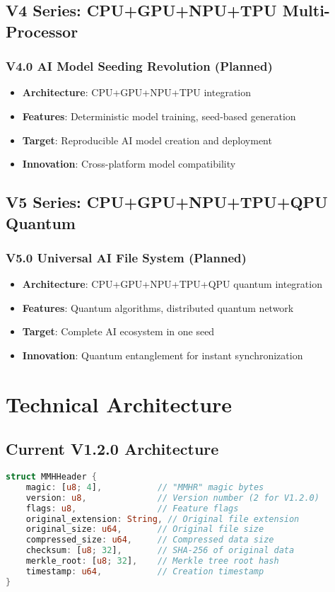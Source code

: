\documentclass[12pt,a4paper]{article}
\begin{document}
\subsection{V4 Series: CPU+GPU+NPU+TPU Multi-Processor}
\subsubsection{V4.0 AI Model Seeding Revolution (Planned)}
\begin{itemize}
    \item \textbf{Architecture}: CPU+GPU+NPU+TPU integration
    \item \textbf{Features}: Deterministic model training, seed-based generation
    \item \textbf{Target}: Reproducible AI model creation and deployment
    \item \textbf{Innovation}: Cross-platform model compatibility
\end{itemize}

\subsection{V5 Series: CPU+GPU+NPU+TPU+QPU Quantum}
\subsubsection{V5.0 Universal AI File System (Planned)}
\begin{itemize}
    \item \textbf{Architecture}: CPU+GPU+NPU+TPU+QPU quantum integration
    \item \textbf{Features}: Quantum algorithms, distributed quantum network
    \item \textbf{Target}: Complete AI ecosystem in one seed
    \item \textbf{Innovation}: Quantum entanglement for instant synchronization
\end{itemize}

\newpage

\section{Technical Architecture}

\subsection{Current V1.2.0 Architecture}
\begin{lstlisting}[language=Rust, caption=Core File Format Structure]
struct MMHHeader {
    magic: [u8; 4],           // "MMHR" magic bytes
    version: u8,              // Version number (2 for V1.2.0)
    flags: u8,                // Feature flags
    original_extension: String, // Original file extension
    original_size: u64,       // Original file size
    compressed_size: u64,     // Compressed data size
    checksum: [u8; 32],       // SHA-256 of original data
    merkle_root: [u8; 32],    // Merkle tree root hash
    timestamp: u64,           // Creation timestamp
}
\end{lstlisting}
\end{document}
